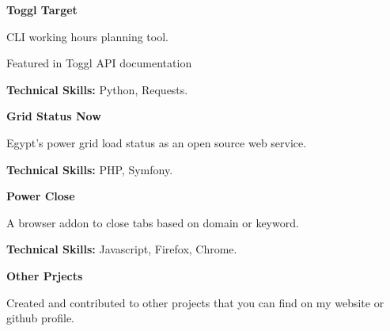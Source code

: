

\begin{cventries}

  \cventry
    {\textbf{Toggl Target}} %
    {} %
    {} %
    {} %
    {
      \begin{cvitems} %
        \item {CLI working hours planning tool.}
        \item {Featured in Toggl API documentation}
        \item {\textbf{Technical Skills:} Python, Requests.}
      \end{cvitems}
    }


  \cventry
    {\textbf{Grid Status Now}} %
    {} %
    {} %
    {} %
    {
      \begin{cvitems} %
        \item {Egypt’s power grid load status as an open source web service.}
        \item {\textbf{Technical Skills:} PHP, Symfony.}
      \end{cvitems}
    }

  \cventry
    {\textbf{Power Close}} %
    {} %
    {} %
    {} %
    {
      \begin{cvitems} %
        \item {A browser addon to close tabs based on domain or keyword.}
        \item {\textbf{Technical Skills:} Javascript, Firefox, Chrome.}
      \end{cvitems}
    }

  \cventry
    {\textbf{Other Prjects}} %
    {} %
    {} %
    {} %
    {
      \begin{cvitems} %
        \item {Created and contributed to other projects that you can find on my website or github
          profile.}
      \end{cvitems}
    }
\end{cventries}

